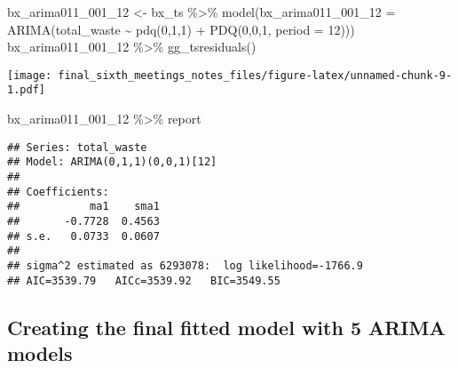 \documentclass[
]{article}
\newenvironment{Shaded}{\begin{snugshade}}{\end{snugshade}}
\newcommand{\AttributeTok}[1]{\textcolor[rgb]{0.77,0.63,0.00}{#1}}
\newcommand{\DecValTok}[1]{\textcolor[rgb]{0.00,0.00,0.81}{#1}}
\newcommand{\FunctionTok}[1]{\textcolor[rgb]{0.00,0.00,0.00}{#1}}
\newcommand{\NormalTok}[1]{#1}
\newcommand{\OtherTok}[1]{\textcolor[rgb]{0.56,0.35,0.01}{#1}}
\newcommand{\SpecialCharTok}[1]{\textcolor[rgb]{0.00,0.00,0.00}{#1}}
\begin{document}
\begin{Shaded}
\begin{Highlighting}[]
\NormalTok{bx\_arima011\_001\_12 }\OtherTok{\textless{}{-}}\NormalTok{ bx\_ts }\SpecialCharTok{\%\textgreater{}\%} \FunctionTok{model}\NormalTok{(}\AttributeTok{bx\_arima011\_001\_12 =} \FunctionTok{ARIMA}\NormalTok{(total\_waste }\SpecialCharTok{\textasciitilde{}} \FunctionTok{pdq}\NormalTok{(}\DecValTok{0}\NormalTok{,}\DecValTok{1}\NormalTok{,}\DecValTok{1}\NormalTok{) }\SpecialCharTok{+} \FunctionTok{PDQ}\NormalTok{(}\DecValTok{0}\NormalTok{,}\DecValTok{0}\NormalTok{,}\DecValTok{1}\NormalTok{, }\AttributeTok{period =} \DecValTok{12}\NormalTok{))) }
\NormalTok{bx\_arima011\_001\_12 }\SpecialCharTok{\%\textgreater{}\%} \FunctionTok{gg\_tsresiduals}\NormalTok{()}
\end{Highlighting}
\end{Shaded}

\texttt{[image: final\_sixth\_meetings\_notes\_files/figure-latex/unnamed-chunk-9-1.pdf]}

\begin{Shaded}
\begin{Highlighting}[]
\NormalTok{bx\_arima011\_001\_12 }\SpecialCharTok{\%\textgreater{}\%}\NormalTok{ report}
\end{Highlighting}
\end{Shaded}

\begin{verbatim}
## Series: total_waste 
## Model: ARIMA(0,1,1)(0,0,1)[12] 
## 
## Coefficients:
##           ma1    sma1
##       -0.7728  0.4563
## s.e.   0.0733  0.0607
## 
## sigma^2 estimated as 6293078:  log likelihood=-1766.9
## AIC=3539.79   AICc=3539.92   BIC=3549.55
\end{verbatim}

\hypertarget{creating-the-final-fitted-model-with-5-arima-models}{%
\subsection{Creating the final fitted model with 5 ARIMA
models}\label{creating-the-final-fitted-model-with-5-arima-models}}
\end{document}
